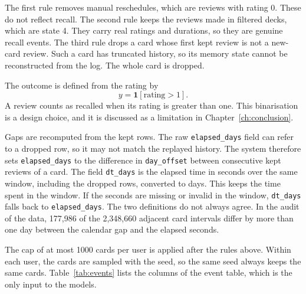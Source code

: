 The first rule removes manual reschedules, which are reviews with rating 0. These do not reflect recall. The
second rule keeps the reviews made in filtered decks, which are state 4. They carry real ratings and durations, so
they are genuine recall events. The third rule drops a card whose first kept review is not a new-card review. Such a
card has truncated history, so its memory state cannot be reconstructed from the log. The whole card is dropped.

The outcome is defined from the rating by
\begin{equation}
  y = \mathbf{1}[\mathrm{rating} > 1].
  \label{eq:label}
\end{equation}
A review counts as recalled when its rating is greater than one. This binarisation is a design choice, and it
is discussed as a limitation in Chapter~\ref{ch:conclusion}.

Gaps are recomputed from the kept rows. The raw \texttt{elapsed\_days} field can refer to a dropped row, so it may
not match the replayed history. The system therefore sets \texttt{elapsed\_days} to the difference in
\texttt{day\_offset} between consecutive kept reviews of a card. The field \texttt{dt\_days} is the elapsed time in
seconds over the same window, including the dropped rows, converted to days. This keeps the time spent in the window.
If the seconds are missing or invalid in the window, \texttt{dt\_days} falls back to \texttt{elapsed\_days}. The
two definitions do not always agree. In the audit of the data, 177,986 of the 2,348,660 adjacent card intervals
differ by more than one day between the calendar gap and the elapsed seconds.

The cap of at most 1000 cards per user is applied after the rules above. Within each user, the cards are sampled with
the seed, so the same seed always keeps the same cards. Table~\ref{tab:events} lists the columns of the event table,
which is the only input to the models.


